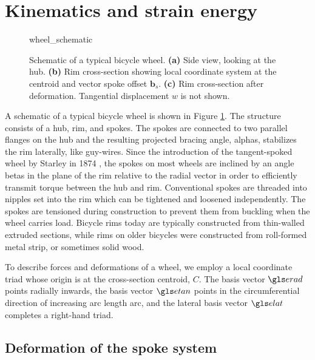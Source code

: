 \documentclass[\rootdir/thesis.tex]{subfiles}
\begin{document}
\section{Kinematics and strain energy}

\begin{figure}[b]
\centering
{wheel_schematic}
\caption{Schematic of a typical bicycle wheel. \textbf{(a)} Side view, looking at the hub. \textbf{(b)} Rim cross-section showing local coordinate system at the centroid and vector spoke offset $\mathbf{b}_s$. \textbf{(c)} Rim cross-section after deformation. Tangential displacement $w$ is not shown.}
\label{fig:wheel_schematic}
\end{figure}

A schematic of a typical bicycle wheel is shown in Figure \ref{fig:wheel_schematic}. The structure consists of a hub, rim, and spokes. The spokes are connected to two parallel flanges on the hub and the resulting projected bracing angle, \gls{alphas}, stabilizes the rim laterally, like guy-wires. Since the introduction of the tangent-spoked wheel by Starley in 1874 \cite{Hadland2014}, the spokes on most wheels are inclined by an angle \gls{betas} in the plane of the rim relative to the radial vector in order to efficiently transmit torque between the hub and rim. Conventional spokes are threaded into nipples set into the rim which can be tightened and loosened independently. The spokes are tensioned during construction to prevent them from buckling when the wheel carries load. Bicycle rims today are typically constructed from thin-walled extruded sections, while rims on older bicycles were constructed from roll-formed metal strip, or sometimes solid wood.

To describe forces and deformations of a wheel, we employ a local coordinate triad whose origin is at the cross-section centroid, $C$. The basis vector $\et$ points radially inwards, the basis vector $\eh$ points in the circumferential direction of increasing arc length \gls{arc}, and the lateral basis vector $\eo$ completes a right-hand triad.



\subsection{Deformation of the spoke system}

\end{document}
